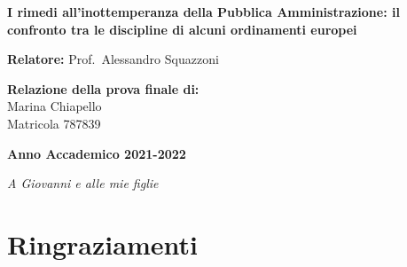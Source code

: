 \documentclass[12pt,it,a4paper,]{report}
\begin{document}
\begin{titlepage}
        \vspace{10mm}
        
      	\begin{center}
            {\LARGE{
                    \textbf{I rimedi all'inottemperanza della Pubblica
Amministrazione: il confronto tra le discipline di alcuni ordinamenti
europei}
                    \par
            }}
        \end{center}

        
        \vspace{7mm}

        \noindent
        {\large \textbf{Relatore:}  Prof.~Alessandro Squazzoni } \\


        \begin{flushright}
            {\large \textbf{Relazione della prova finale di:}} \\
            \large{Marina Chiapello} \\
            \large{Matricola 787839} 
        \end{flushright}
        
        \vspace{1mm}
        \begin{center}
            {\large{\bf Anno Accademico 2021-2022}}
        \end{center}

        \restoregeometry
        
    \end{titlepage}




\vspace*{\fill}

\noindent \hfill{
\textit{
A Giovanni e alle mie figlie
}} \vspace*{\fill}  \newpage

\setcounter{page}{1}

\hypertarget{ringraziamenti}{%
\chapter*{Ringraziamenti}\label{ringraziamenti}}
\end{document}
